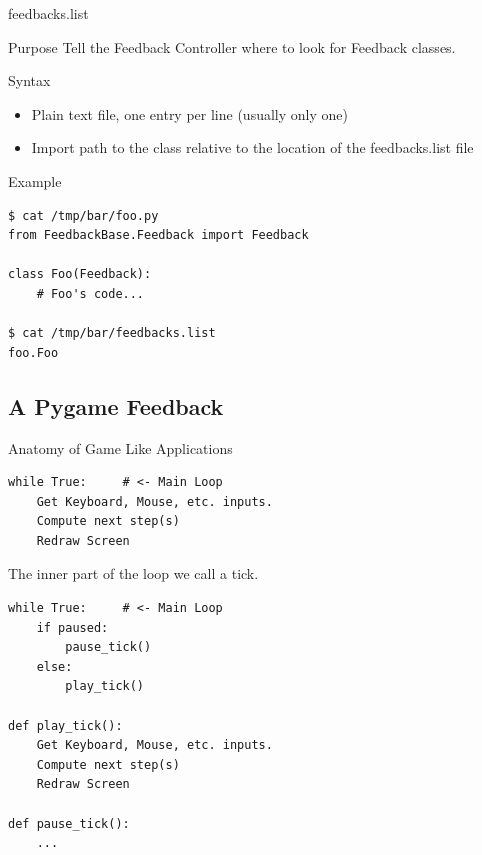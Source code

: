 \documentclass{beamer}
\begin{document}
\begin{frame}[fragile]{feedbacks.list}
    \begin{block}{Purpose}
        Tell the Feedback Controller where to look for Feedback classes.
    \end{block}
    \begin{block}{Syntax}
        \begin{itemize}
            \item Plain text file, one entry per line (usually only one)
            \item Import path to the class relative to the location of the
                \alert{feedbacks.list} file
        \end{itemize}
    \end{block}
    \begin{exampleblock}{Example}
        \begin{lstlisting}
$ cat /tmp/bar/foo.py
from FeedbackBase.Feedback import Feedback

class Foo(Feedback):
    # Foo's code...

$ cat /tmp/bar/feedbacks.list
foo.Foo
        \end{lstlisting}
    \end{exampleblock}
\end{frame}

\subsection{A Pygame Feedback}
\begin{frame}{Anatomy of Game Like Applications}
    \begin{lstlisting}
while True:     # <- Main Loop
    Get Keyboard, Mouse, etc. inputs.
    Compute next step(s)
    Redraw Screen
    \end{lstlisting}
    The inner part of the loop we call a \alert{tick}.
    \pause
    \begin{lstlisting}
while True:     # <- Main Loop
    if paused:
        pause_tick()
    else:
        play_tick()

def play_tick():
    Get Keyboard, Mouse, etc. inputs.
    Compute next step(s)
    Redraw Screen

def pause_tick():
    ...
    \end{lstlisting}

\end{frame}
\end{document}

